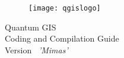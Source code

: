 
\begin{titlepage}
\begin{center}

\begin{figure}[H]
\begin{center}
\texttt{[image: qgislogo]} 
\end{center}
\end{figure}

\Huge{Quantum GIS}\\
\vspace{0.5cm}
\Large{Coding and Compilation Guide} \\
\vspace{0.5cm}
\Large{Version ~\CURRENT \textsl{'Mimas'}}

\end{center}
\end{titlepage}
